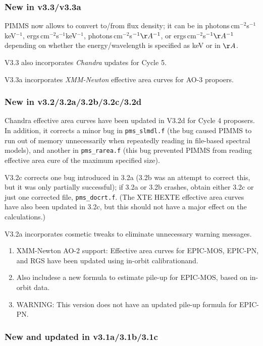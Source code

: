\subsubsection{New in v3.3/v3.3a}

PIMMS now allows to convert to/from flux density; it can be in
photons\,cm$^{-2}$s$^{-1}$keV$^{-1}$, ergs\,cm$^{-2}$s$^{-1}$keV$^{-1}$,
photons\,cm$^{-2}$s$^{-1} \AA^{-1}$, or ergs\,cm$^{-2}$s$^{-1} \AA^{-1}$
depending on whether the energy/wavelength is specified as keV or in
$\AA$.

V3.3 also incorporates {\sl Chandra\/} updates for Cycle 5.

V3.3a incorporates {\sl XMM-Newton\/} effective area curves for
AO-3 propoers.

\subsubsection{New in v3.2/3.2a/3.2b/3.2c/3.2d}

Chandra effective area curves have been updated in V3.2d
for Cycle 4 proposers.  In addition, it corrects a minor
bug in {\tt pms\_slmdl.f} (the bug caused PIMMS to run out
of memory unnecessarily when repeatedly reading in file-based
spectral models), and another in {\tt pms\_rarea.f} (this bug
prevented PIMMS from reading effective area cure of the maximum
specified size).

V3.2c corrects one bug introduced in 3.2a (3.2b was an attempt
to correct this, but it was only partially successful); if 3.2a
or 3.2b crashes, obtain either 3.2c or just one corrected file,
{\tt pms\_docrt.f}.  (The XTE HEXTE effective area curves have
also been updated in 3.2c, but this should not have a major effect
on the calculations.)

V3.2a incorporates cosmetic tweaks to eliminate unnecessary warning
messages.

\begin{enumerate}
\item XMM-Newton AO-2 support: Effective area curves for EPIC-MOS, EPIC-PN,
	and RGS have been updated using in-orbit calibrationand.
\item Also includese a new formula to estimate pile-up for EPIC-MOS,
	based on in-orbit data.
\item WARNING: This version does not have an updated pile-up formula for
	EPIC-PN.
\end{enumerate}

\subsubsection{New and updated in v3.1a/3.1b/3.1c}

